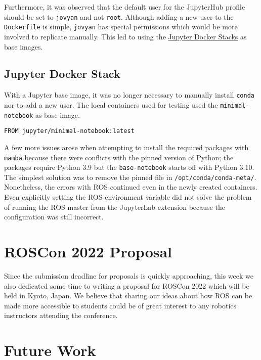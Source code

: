     Furthermore, it was observed that the default user for the JupyterHub profile should be set to \texttt{jovyan} and not \texttt{root}. Although adding a new user to the \texttt{Dockerfile} is simple, \texttt{jovyan} has special permissions which would be more involved to replicate manually. This led to using the \href{https://jupyter-docker-stacks.readthedocs.io/en/latest/index.html}{Jupyter Docker Stacks} as base images.


    \subsection{Jupyter Docker Stack}

    With a Jupyter base image, it was no longer necessary to manually install \texttt{conda} nor to add a new user. The local containers used for testing used the \texttt{minimal-notebook} as base image.


    \begin{lstlisting}[language=docker]
FROM jupyter/minimal-notebook:latest
    \end{lstlisting}

    A few more issues arose when attempting to install the required packages with \texttt{mamba} because there were conflicts with the pinned version of Python; the packages require Python 3.9 but the \texttt{base-notebook} starts off with Python 3.10. The simplest solution was to remove the pinned file in \texttt{/opt/conda/conda-meta/}.
    Nonetheless, the errors with ROS continued even in the newly created containers. Even explicitly setting the ROS environment variable did not solve the problem of running the ROS master from the JupyterLab extension because the configuration was still incorrect.

\section{ROSCon 2022 Proposal}

    Since the submission deadline for proposals is quickly approaching, this week we also dedicated some time to writing a proposal for ROSCon 2022 which will be held in Kyoto, Japan. We believe that sharing our ideas about how ROS can be made more accessible to students could be of great interest to any robotics instructors attending the conference.

\section{Future Work}

